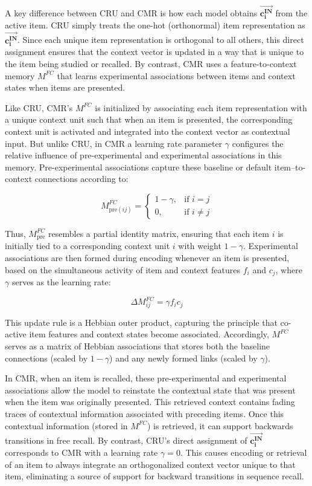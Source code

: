 \documentclass[
  letterpaper,
  DIV=11,
  numbers=noendperiod]{scrartcl}
\begin{document}
A key difference between CRU and CMR is how each model obtains
\(\mathbf{\vec{c_i^{IN}}}\) from the active item. CRU simply treats the
one-hot (orthonormal) item representation as
\(\mathbf{\vec{c_i^{IN}}}\). Since each unique item representation is
orthogonal to all others, this direct assignment ensures that the
context vector is updated in a way that is unique to the item being
studied or recalled. By contrast, CMR uses a feature-to-context memory
\(M^{FC}\) that learns experimental associations between items and
context states when items are presented.

Like CRU, CMR's \(M^{FC}\) is initialized by associating each item
representation with a unique context unit such that when an item is
presented, the corresponding context unit is activated and integrated
into the context vector as contextual input. But unlike CRU, in CMR a
learning rate parameter \(\gamma\) configures the relative influence of
pre-experimental and experimental associations in this memory.
Pre-experimental associations capture these baseline or default
item--to-context connections according to:

\[
M^{FC}_{\text{pre}(ij)} = \begin{cases} 
1 - \gamma, & \text{if } i=j \\ 
0, & \text{if } i \neq j 
\end{cases}
\]

Thus, \(M^{FC}_\text{pre}\) resembles a partial identity matrix,
ensuring that each item \(i\) is initially tied to a corresponding
context unit \(i\) with weight \(1 - \gamma\). Experimental associations
are then formed during encoding whenever an item is presented, based on
the simultaneous activity of item and context features \(f_i\) and
\(c_j\), where \(\gamma\) serves as the learning rate:

\[
\Delta M^{FC}_{ij} = \gamma f_i c_j
\]

This update rule is a Hebbian outer product, capturing the principle
that co-active item features and context states become associated.
Accordingly, \(M^{FC}\) serves as a matrix of Hebbian associations that
stores both the baseline connections (scaled by \(1 - \gamma\)) and any
newly formed links (scaled by \(\gamma\)).

In CMR, when an item is recalled, these pre-experimental and
experimental associations allow the model to reinstate the contextual
state that was present when the item was originally presented. This
retrieved context contains fading traces of contextual information
associated with preceding items. Once this contextual information
(stored in \(M^{FC}\)) is retrieved, it can support backwards
transitions in free recall. By contrast, CRU's direct assignment of
\(\mathbf{\vec{c_i^{IN}}}\) corresponds to CMR with a learning rate
\(\gamma=0\). This causes encoding or retrieval of an item to always
integrate an orthogonalized context vector unique to that item,
eliminating a source of support for backward transitions in sequence
recall.
\end{document}

